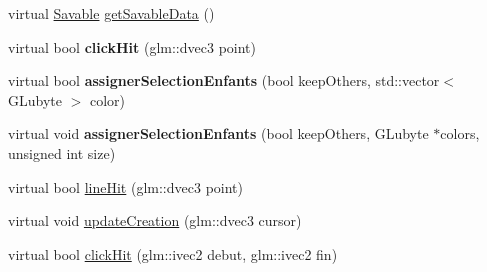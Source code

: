 \begin{DoxyCompactItemize}
\item 
virtual \hyperlink{class_savable}{Savable} \hyperlink{group__inf2990_ga1729231ec41b3ba4d6668eba101ead44}{get\-Savable\-Data} ()
\item 
\hypertarget{group__inf2990_gaa43f307d42d6dd8890cdce48c5c53128}{virtual bool {\bfseries click\-Hit} (glm\-::dvec3 point)}\label{group__inf2990_gaa43f307d42d6dd8890cdce48c5c53128}

\item 
\hypertarget{group__inf2990_ga2b6b37d21944528e0c02f563fa12927b}{virtual bool {\bfseries assigner\-Selection\-Enfants} (bool keep\-Others, std\-::vector$<$ G\-Lubyte $>$ color)}\label{group__inf2990_ga2b6b37d21944528e0c02f563fa12927b}

\item 
\hypertarget{group__inf2990_ga30b0e5b609578bf879a59b71af5fa1ff}{virtual void {\bfseries assigner\-Selection\-Enfants} (bool keep\-Others, G\-Lubyte $\ast$colors, unsigned int size)}\label{group__inf2990_ga30b0e5b609578bf879a59b71af5fa1ff}

\item 
virtual bool \hyperlink{group__inf2990_gaf7c1f8526b0f7da001e9c3cb5e8e3540}{line\-Hit} (glm\-::dvec3 point)
\item 
virtual void \hyperlink{group__inf2990_ga233fd4600812176c557bb94ea04da5c9}{update\-Creation} (glm\-::dvec3 cursor)
\end{DoxyCompactItemize}
{\bf }\par
\begin{DoxyCompactItemize}
\item 
virtual bool \hyperlink{group__inf2990_gad1d1a9c6adcedfcd5eda6c6d4e67a50f}{click\-Hit} (glm\-::ivec2 debut, glm\-::ivec2 fin)
\end{DoxyCompactItemize}

